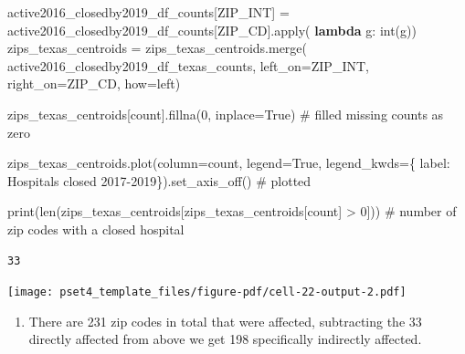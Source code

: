 \documentclass[
  letterpaper,
  DIV=11,
  numbers=noendperiod]{scrartcl}
\newenvironment{Shaded}{\begin{snugshade}}{\end{snugshade}}
\newcommand{\BuiltInTok}[1]{\textcolor[rgb]{0.00,0.23,0.31}{#1}}
\newcommand{\CommentTok}[1]{\textcolor[rgb]{0.37,0.37,0.37}{#1}}
\newcommand{\DecValTok}[1]{\textcolor[rgb]{0.68,0.00,0.00}{#1}}
\newcommand{\KeywordTok}[1]{\textcolor[rgb]{0.00,0.23,0.31}{\textbf{#1}}}
\newcommand{\NormalTok}[1]{\textcolor[rgb]{0.00,0.23,0.31}{#1}}
\newcommand{\OperatorTok}[1]{\textcolor[rgb]{0.37,0.37,0.37}{#1}}
\newcommand{\StringTok}[1]{\textcolor[rgb]{0.13,0.47,0.30}{#1}}
\newcommand{\VariableTok}[1]{\textcolor[rgb]{0.07,0.07,0.07}{#1}}
\providecommand{\tightlist}{%
  \setlength{\itemsep}{0pt}\setlength{\parskip}{0pt}}\usepackage{longtable,booktabs,array}
\begin{document}
\begin{Shaded}
\begin{Highlighting}[]
\NormalTok{active2016\_closedby2019\_df\_counts[}\StringTok{\textquotesingle{}ZIP\_INT\textquotesingle{}}\NormalTok{] }\OperatorTok{=}\NormalTok{ active2016\_closedby2019\_df\_counts[}\StringTok{\textquotesingle{}ZIP\_CD\textquotesingle{}}\NormalTok{].}\BuiltInTok{apply}\NormalTok{(}
    \KeywordTok{lambda}\NormalTok{ g: }\BuiltInTok{int}\NormalTok{(g))}
\NormalTok{zips\_texas\_centroids }\OperatorTok{=}\NormalTok{ zips\_texas\_centroids.merge(}
\NormalTok{    active2016\_closedby2019\_df\_texas\_counts, left\_on}\OperatorTok{=}\StringTok{\textquotesingle{}ZIP\_INT\textquotesingle{}}\NormalTok{, right\_on}\OperatorTok{=}\StringTok{\textquotesingle{}ZIP\_CD\textquotesingle{}}\NormalTok{, how}\OperatorTok{=}\StringTok{\textquotesingle{}left\textquotesingle{}}\NormalTok{)}

\NormalTok{zips\_texas\_centroids[}\StringTok{\textquotesingle{}count\textquotesingle{}}\NormalTok{].fillna(}\DecValTok{0}\NormalTok{, inplace}\OperatorTok{=}\VariableTok{True}\NormalTok{)}
\CommentTok{\# filled missing counts as zero}

\NormalTok{zips\_texas\_centroids.plot(column}\OperatorTok{=}\StringTok{\textquotesingle{}count\textquotesingle{}}\NormalTok{, legend}\OperatorTok{=}\VariableTok{True}\NormalTok{, legend\_kwds}\OperatorTok{=}\NormalTok{\{}
                          \StringTok{\textquotesingle{}label\textquotesingle{}}\NormalTok{: }\StringTok{\textquotesingle{}Hospitals closed 2017{-}2019\textquotesingle{}}\NormalTok{\}).set\_axis\_off() }\CommentTok{\# plotted}

\BuiltInTok{print}\NormalTok{(}\BuiltInTok{len}\NormalTok{(zips\_texas\_centroids[zips\_texas\_centroids[}\StringTok{\textquotesingle{}count\textquotesingle{}}\NormalTok{] }\OperatorTok{\textgreater{}} \DecValTok{0}\NormalTok{])) }\CommentTok{\# number of zip codes with a closed hospital}
\end{Highlighting}
\end{Shaded}

\begin{verbatim}
33
\end{verbatim}

\texttt{[image: pset4\_template\_files/figure-pdf/cell-22-output-2.pdf]}

\begin{enumerate}
\def\labelenumi{\arabic{enumi}.}
\setcounter{enumi}{2}
\tightlist
\item
  There are 231 zip codes in total that were affected, subtracting the
  33 directly affected from above we get 198 specifically indirectly
  affected.
\end{enumerate}
\end{document}
